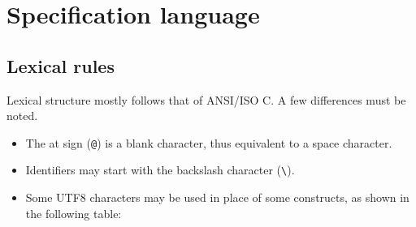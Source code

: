 
\chapter{Specification language}
\label{chap:base}

\section{Lexical rules}

Lexical structure mostly follows that of ANSI/ISO C. A few differences
must be noted.
\begin{itemize}
\item The at sign (\verb|@|) is a blank character, thus equivalent
  to a space character.
\item Identifiers may start with the backslash character (\verb|\|).
\item Some UTF8 characters may be used in place of some constructs, as
  shown in the following table:


\end{itemize}
